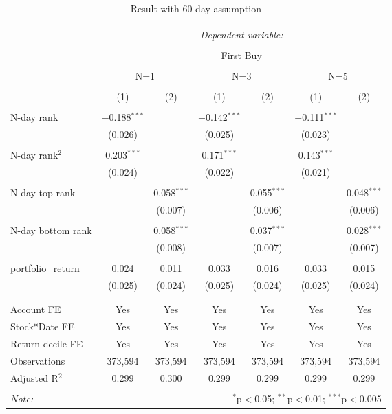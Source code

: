 
\begin{table}[!htbp] \centering 
  \caption{Result with 60-day assumption} 
  \label{} 
\begin{tabular}{@{\extracolsep{5pt}}lcccccc} 
\\[-1.8ex]\hline 
\hline \\[-1.8ex] 
 & \multicolumn{6}{c}{\textit{Dependent variable:}} \\ 
\cline{2-7} 
\\[-1.8ex] & \multicolumn{6}{c}{First Buy} \\ 
\\[-1.8ex] & \multicolumn{2}{c}{N=1}& \multicolumn{2}{c}{N=3}& \multicolumn{2}{c}{N=5} \\
\cmidrule(lr){2-3}
\cmidrule(lr){4-5}
\cmidrule(lr){6-7}
\\[-1.8ex] & (1) & (2) & (1) & (2) & (1) & (2)\\ 
\hline \\[-1.8ex]
  N-day rank & $-$0.188$^{***}$ &  & $-$0.142$^{***}$ &  & $-$0.111$^{***}$ &  \\ 
  & (0.026) &  & (0.025) &  & (0.023) &  \\ 
  & & & & & & \\  
  N-day rank$^2$  & 0.203$^{***}$ &  & 0.171$^{***}$ &  & 0.143$^{***}$ &  \\ 
  & (0.024) &  & (0.022) &  & (0.021) &  \\ 
  & & & & & & \\ 
  N-day top rank &  & 0.058$^{***}$ &  & 0.055$^{***}$ &  & 0.048$^{***}$ \\ 
  &  & (0.007) &  & (0.006) &  & (0.006) \\ 
  & & & & & & \\ 
  N-day bottom rank &  & 0.058$^{***}$ &  & 0.037$^{***}$ &  & 0.028$^{***}$ \\ 
  &  & (0.008) &  & (0.007) &  & (0.007) \\ 
  & & & & & & \\ 
 portfolio\_return & 0.024 & 0.011 & 0.033 & 0.016 & 0.033 & 0.015 \\ 
  & (0.025) & (0.024) & (0.025) & (0.024) & (0.025) & (0.024) \\ 
  & & & & & & \\ 
\hline \\[-1.8ex] 
Account FE & Yes & Yes & Yes & Yes & Yes & Yes \\ 
Stock*Date FE & Yes & Yes & Yes & Yes & Yes & Yes \\ 
Return decile FE & Yes & Yes & Yes & Yes & Yes & Yes \\ 
Observations & 373,594 & 373,594 & 373,594 & 373,594 & 373,594 & 373,594 \\ 
Adjusted R$^{2}$ & 0.299 & 0.300 & 0.299 & 0.299 & 0.299 &  0.299 \\ 
\hline 
\hline \\[-1.8ex] 
\textit{Note:}  & \multicolumn{6}{r}{$^{*}$p$<$0.05; $^{**}$p$<$0.01; $^{***}$p$<$0.005} \\ 
\end{tabular} 
\end{table} 
